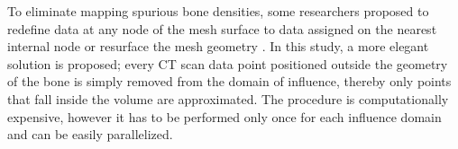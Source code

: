 \documentclass[11pt]{acmeArticle}
\numberwithin{equation}{section}
\begin{document}
To eliminate mapping spurious bone densities, some researchers proposed to redefine data at any node of the mesh surface to data assigned on the nearest internal node \citep{helgason2008modified, chen2010new} or resurface the mesh geometry \citep{peleg2014can}. 
In this study, a more elegant solution is proposed; every CT scan data point positioned outside the geometry of the bone is simply removed from the domain of influence, thereby only points that fall inside the volume are approximated. 
The procedure is computationally expensive, however it has to be performed only once for each influence domain and can be easily parallelized. %
\end{document}
